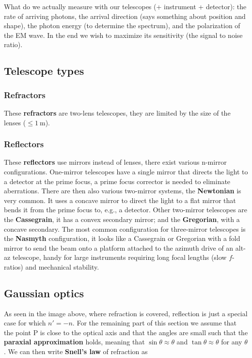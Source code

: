 \documentclass[a4paper]{article}
\begin{document}
What do we actually measure with our telescopes (+ instrument + detector): the rate of arriving photons, the arrival direction (says something about position and shape), the photon energy (to determine the spectrum), and the polarization of the EM wave. In the end we wish to maximize its sensitivity (the signal to noise ratio).

\subsection{Telescope types}

\subsubsection*{Refractors}

These \textbf{refractors} are two-lens telescopes, they are limited by the size of the lenses ($\le 1\ \si{\meter}$).

\subsubsection*{Reflectors}

These \textbf{reflectors} use mirrors instead of lenses, there exist various n-mirror configurations. One-mirror telescopes have a single mirror that directs the light to a detector at the prime focus, a prime focus corrector is needed to eliminate aberrations. There are then also various two-mirror systems, the \textbf{Newtonian} is very common. It uses a concave mirror to direct the light to a flat mirror that bends it from the prime focus to, e.g., a detector. Other two-mirror telescopes are the \textbf{Cassegrain}, it has a convex secondary mirror; and the \textbf{Gregorian}, with a concave secondary. The most common configuration for three-mirror telescopes is the \textbf{Nasmyth} configuration, it looks like a Cassegrain or Gregorian with a fold mirror to send the beam onto a platform attached to the azimuth drive of an alt-az telescope, handy for large instruments requiring long focal lengths (slow $f$-ratios) and mechanical stability.

\subsection{Gaussian optics}

As seen in the image above, where refraction is covered, reflection is just a special case for which $n'=-n$. For the remaining part of this section we assume that the point P is close to the optical axis and that the angles are small such that the \textbf{paraxial approximation} holds, meaning that $\sin\theta\approx\theta$ and $\tan\theta\approx\theta$ for any $\theta$. We can then write \textbf{Snell's law} of refraction as  
\end{document}

